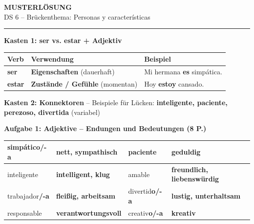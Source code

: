 \documentclass[11pt,a4paper]{article}
\newcommand{\lsg}[1]{\textcolor{loesung}{\textbf{#1}}}
\begin{document}
\begin{center}
{\Large\textbf{\textcolor{loesung}{MUSTERLÖSUNG}}}\\[0.3em]
{\large DS 6 -- Brückenthema: Personas y características}
\end{center}

\vspace{0.5em}
\hrule
\vspace{1em}

\begin{gruppenbox}

\textbf{Kasten 1: ser vs. estar + Adjektiv}

\begin{tabularx}{\textwidth}{@{}|p{2.5cm}|X|X|@{}}
\hline
\textbf{Verb} & \textbf{Verwendung} & \textbf{Beispiel} \\
\hline
\textbf{ser} & \lsg{Eigenschaften} (dauerhaft) & Mi hermana \lsg{es} simpática. \\
\hline
\textbf{estar} & \lsg{Zustände / Gefühle} (momentan) & Hoy \lsg{estoy} cansado. \\
\hline
\end{tabularx}

\vspace{0.5em}
\textbf{Kasten 2: Konnektoren} -- Beispiele für Lücken: \lsg{inteligente, paciente, perezoso, divertida} (variabel)

\vspace{0.8em}

\textbf{Aufgabe 1: Adjektive -- Endungen und Bedeutungen (8 P.)}

\begin{tabularx}{\textwidth}{@{}|X|X|X|X|@{}}
\hline
simpátic\lsg{o/-a} & \lsg{nett, sympathisch} & paciente & \lsg{geduldig} \\
\hline
inteligente & \lsg{intelligent, klug} & amable & \lsg{freundlich, liebenswürdig} \\
\hline
trabajador\lsg{/-a} & \lsg{fleißig, arbeitsam} & divertid\lsg{o/-a} & \lsg{lustig, unterhaltsam} \\
\hline
responsable & \lsg{verantwortungsvoll} & creativ\lsg{o/-a} & \lsg{kreativ} \\
\hline
\end{tabularx}


\end{gruppenbox}
\end{document}
